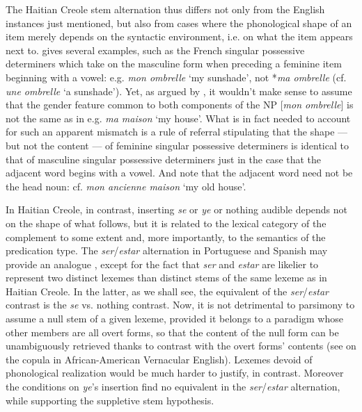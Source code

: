 \documentclass[output=paper]{langsci/langscibook}
\begin{document}
The Haitian Creole stem alternation thus differs not only from the
English instances just mentioned, but also from cases where the
phonological shape of an item merely depends on the syntactic
environment, i.e. on what the item appears next to. %
\citet{Zwicky85b,Zwicky90} %
%
gives several examples, such as the French singular possessive
determiners which take on the masculine form when preceding a feminine
item beginning with a vowel: e.g. \emph{mon ombrelle} `my sunshade', not
*\emph{ma ombrelle} (cf. \emph{une ombrelle} `a sunshade'). Yet, as
argued by %
\citet{Zwicky85b}, %
%
it wouldn't make sense to assume that the
gender feature common to both components of the NP {[}\emph{mon ombrelle}{]} is
not the same as in e.g. \emph{ma maison} `my house'. What is in fact
needed to account for such an apparent mismatch is a rule of referral
stipulating that the shape --- but not the content --- of feminine
singular possessive determiners is identical to that of masculine
singular possessive determiners just in the case that the adjacent word begins
with a vowel. %
\citep[For rules of referral also see][36--37]{Stump01} %
%
And
note that the adjacent word need not be the head noun: cf. \emph{mon
ancienne maison} `my old house'.

In Haitian Creole, in contrast, inserting \emph{se} or \emph{ye} or
nothing audible depends not on the shape of what follows, but it is
related to the lexical category of the complement to some extent and,
more importantly, to the semantics of the predication type. The
\emph{ser}/\emph{estar} alternation in Portuguese and Spanish may
provide an analogue %
\citep[98--102]{Mateus89}%
%
, except for the fact
that \emph{ser} and \emph{estar} are likelier to represent two distinct
lexemes than distinct stems of the same lexeme as in Haitian Creole. In
the latter, as we shall see, the equivalent of the \emph{ser}/\emph{estar} contrast is the \emph{se} vs. nothing contrast. 
Now, it is not detrimental to parsimony to assume a null stem of a given lexeme,
provided it belongs to a paradigm whose other members are all overt
forms, 
so that the content of the null form can be unambiguously
retrieved thanks to contrast with the overt forms' contents %
(see %
\citealt{Sag03} %
 on the copula in African-American Vernacular English).
%
Lexemes
devoid of phonological realization would be much harder to justify, in
contrast. Moreover the conditions on \emph{ye}'s insertion find no
equivalent in the \emph{ser}/\emph{estar} alternation, while
supporting the suppletive stem hypothesis.
\end{document}
